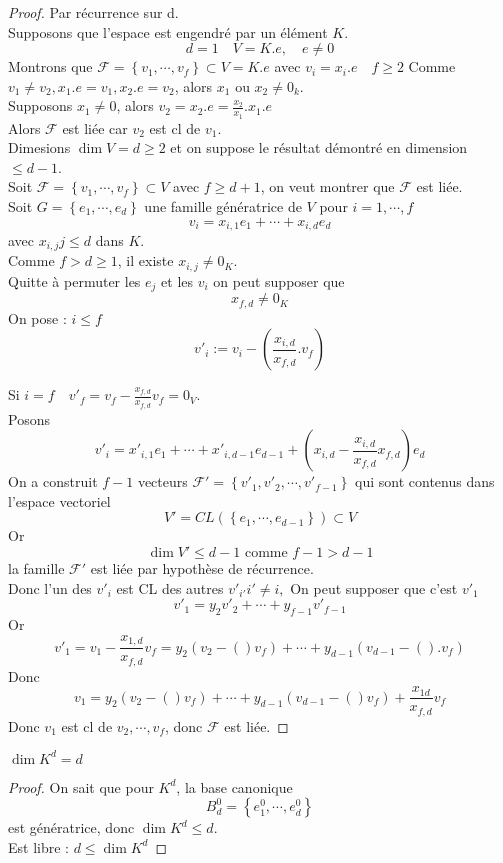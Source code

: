 \documentclass[../main.tex]{subfiles}
\begin{document}
\begin{proof}
Par récurrence sur d.\\
Supposons que l'espace est engendré par un élément $K$.
\[ 
d=1 \quad V= K.e,\quad e\neq 0
\]
Montrons que $ \mathcal{F} = \left\{ v_1, \cdots, v_f \right\} \subset V = K.e$ avec $ v_i = x_i .e \quad f\geq 2$
Comme $v_1 \neq v_2, x_1.e = v_1, x_2.e = v_2$, alors $x_1$ ou $x_2 \neq 0_k$.\\
Supposons $x_1\neq 0$, alors $v_2= x_2.e = \frac{x_2}{x_1}.x_1.e$ \\
Alors $\mathcal{F}$ est liée car $v_2$ est cl de $v_1$.\\
Dimesions $\dim V = d \geq 2$ et on suppose le résultat démontré en dimension $\leq d-1$.\\
Soit $\mathcal{F}= \left\{ v_1,\cdots, v_f \right\} \subset V$ avec $f \geq d+1$, on veut montrer que $\mathcal{F}$ est liée.\\
Soit $G= \left\{ e_1,\cdots, e_d \right\} $ une famille génératrice de $V$ pour $i= 1,\cdots, f$ 
\[ 
v_i = x_{i,1} e_1 + \cdots + x_{i,d} e_d
\]
avec $x_{i,j} j\leq d$ dans $K$.\\
Comme $f> d\geq 1$, il existe $x_{i,j} \neq 0_K$.\\
Quitte à permuter les $e_j$ et les $v_i$ on peut supposer que
\[ 
x_{f,d}  \neq 0_K
\]
On pose : $i\leq f$
\[ 
v'_i  := v_i - \left( \frac{ x_{i,d}  }{x_{f,d} }. v_f \right) 
\]

Si $i=f\quad v'_f = v_f - \frac{x_{f,d} }{x_{f,d} }v_f = 0_V$.\\
Posons 
\[ 
	v'_i = x'_{i,1} e_1 + \cdots + x'_{i,d-1} e_{d-1}  + ( x_{i,d} - \frac{x_{i,d} }{x_{f,d} }x_{f,d}  ) e_d
\]
On a construit $f-1$ vecteurs $\mathcal{F}' =\left\{ v'_1, v'_2,\cdots, v'_{f-1}  \right\} $ qui sont contenus dans l'espace vectoriel
\[ 
	V' = CL ( \left\{ e_1,\cdots, e_{d-1}  \right\} ) \subset V
\]
Or
\[ 
\dim V' \leq d-1 \text{ comme  } f-1 > d-1
\]
la famille $\mathcal{F}'$ est liée par hypothèse de récurrence.\\
Donc l'un des $v'_i$ est CL des autres $v'_{i'} i' \neq i, $ 
On peut supposer que c'est $v'_1$ 
\[ 
	v'_1 = y_2 v'_2 + \cdots + y_{f-1} v'_{f-1} 
\]
Or
\[ 
	v'_1 = v_1 - \frac{x_{1,d} }{x_{f,d} }v_f = y_2 ( v_2 - ( ) v_f) + \cdots + y_{d-1} ( v_{d-1} - (  ) .v_f) 
\]
Donc
\[ 
	v_1 = y_2 (  v_2 - ( ) v_f) + \cdots + y_{d-1} ( v_{d-1} - ( ) v_f)  + \frac{x_{1d} }{x_{f,d} }v_f 
\]
Donc $v_1$ est cl de $v_2, \cdots, v_f$, donc $\mathcal{F}$ est liée.



\end{proof}
\begin{crly}
$\dim K^{d}= d$
\end{crly}
\begin{proof}
On sait que pour $K^{d}$, la base canonique 
\[ 
B_{d} ^{0}= \left\{ e_1^{0}, \cdots, e_{d} ^{0} \right\}  
\]
est génératrice, donc $\dim K^{d}\leq d$.\\
Est libre : $d \leq \dim K^{d}$
\end{proof}
\end{document}
